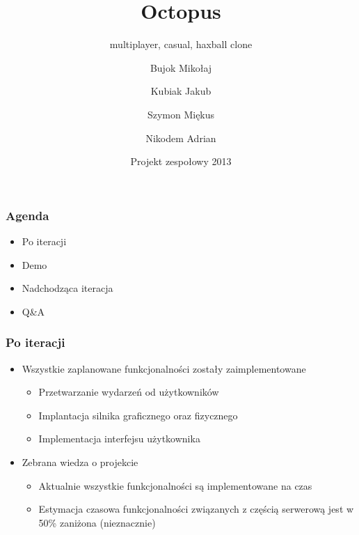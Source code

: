 \documentclass{beamer}
\title
    {Octopus}
\subtitle{multiplayer, casual, haxball clone}
\author[]
           {Bujok Mikołaj \and Kubiak Jakub \\ \and Szymon Miękus\and Nikodem Adrian}
\date[\today]
                {Projekt zespołowy 2013}
\begin{document}
                \frame{\titlepage}
                \begin{frame}
                  \frametitle{Agenda}
                  \begin{itemize}
                  \item Po iteracji
                  \item Demo
                  \item Nadchodząca iteracja
                  \item Q\&A
                  \end{itemize}
                \end{frame}

                \begin{frame}
                  \frametitle{Po iteracji}
                  \begin{itemize}
                  \item Wszystkie zaplanowane funkcjonalności zostały zaimplementowane
                    \begin{itemize}
                    \item Przetwarzanie wydarzeń od użytkowników
                    \item Implantacja silnika graficznego oraz fizycznego
                    \item Implementacja interfejsu użytkownika
                    \end{itemize}
                  \item Zebrana wiedza o projekcie
                    \begin{itemize}
                    \item Aktualnie wszystkie funkcjonalności są implementowane na czas
                    \item Estymacja czasowa funkcjonalności związanych z częścią serwerową jest w 50\% zaniżona (nieznacznie)
                    \end{itemize}
                  \end{itemize}
                \end{frame}
\end{document}
